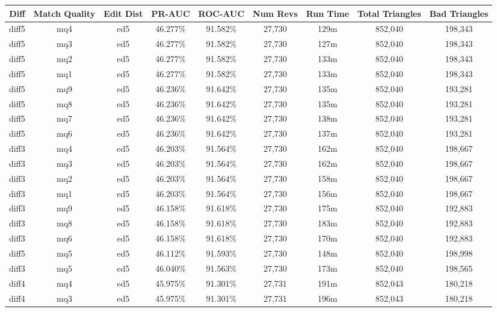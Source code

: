 \begin{sidewaystable}[!ph]
  \begin{center}
    \begin{tabular}{|c|c|c||c|c||c|c|c|c|}
\hline
Diff & Match Quality & Edit Dist
        & PR-AUC & ROC-AUC
        & Num Revs & Run Time
        & Total Triangles & Bad Triangles \\
\hline
\hline
diff5 & mq4 & ed5 & 46.277\% & 91.582\% & 27,730 & 129m & 852,040 & 198,343 \\
diff5 & mq3 & ed5 & 46.277\% & 91.582\% & 27,730 & 127m & 852,040 & 198,343 \\
diff5 & mq2 & ed5 & 46.277\% & 91.582\% & 27,730 & 133m & 852,040 & 198,343 \\
diff5 & mq1 & ed5 & 46.277\% & 91.582\% & 27,730 & 133m & 852,040 & 198,343 \\
diff5 & mq9 & ed5 & 46.236\% & 91.642\% & 27,730 & 135m & 852,040 & 193,281 \\
diff5 & mq8 & ed5 & 46.236\% & 91.642\% & 27,730 & 135m & 852,040 & 193,281 \\
diff5 & mq7 & ed5 & 46.236\% & 91.642\% & 27,730 & 138m & 852,040 & 193,281 \\
diff5 & mq6 & ed5 & 46.236\% & 91.642\% & 27,730 & 137m & 852,040 & 193,281 \\
diff3 & mq4 & ed5 & 46.203\% & 91.564\% & 27,730 & 162m & 852,040 & 198,667 \\
diff3 & mq3 & ed5 & 46.203\% & 91.564\% & 27,730 & 162m & 852,040 & 198,667 \\
diff3 & mq2 & ed5 & 46.203\% & 91.564\% & 27,730 & 158m & 852,040 & 198,667 \\
diff3 & mq1 & ed5 & 46.203\% & 91.564\% & 27,730 & 156m & 852,040 & 198,667 \\
diff3 & mq9 & ed5 & 46.158\% & 91.618\% & 27,730 & 175m & 852,040 & 192,883 \\
diff3 & mq8 & ed5 & 46.158\% & 91.618\% & 27,730 & 183m & 852,040 & 192,883 \\
diff3 & mq6 & ed5 & 46.158\% & 91.618\% & 27,730 & 170m & 852,040 & 192,883 \\
diff5 & mq5 & ed5 & 46.112\% & 91.593\% & 27,730 & 148m & 852,040 & 198,998 \\
diff3 & mq5 & ed5 & 46.040\% & 91.563\% & 27,730 & 173m & 852,040 & 198,565 \\
diff4 & mq4 & ed5 & 45.975\% & 91.301\% & 27,731 & 191m & 852,043 & 180,218 \\
diff4 & mq3 & ed5 & 45.975\% & 91.301\% & 27,731 & 196m & 852,043 & 180,218 \\

\end{tabular}
\end{center}
\end{sidewaystable}
